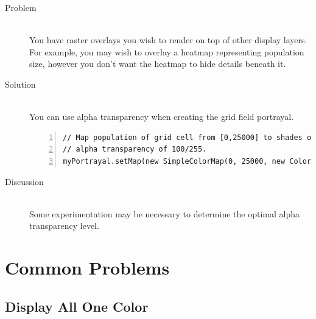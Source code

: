\documentclass[twoside,10pt]{book}
\begin{document}
\begin{description}
\item[Problem]~\\
  You have raster overlays you wish to render on top of other display
  layers.  For example, you may wish to overlay a heatmap representing
  population size, however you don't want the heatmap to hide details
  beneath it.

\item[Solution]~\\
You can use alpha transparency when creating the grid field portrayal.  

\begin{Verbatim}[frame=lines,framesep=5mm,numbers=left]
// Map population of grid cell from [0,25000] to shades of red from [0,255] with 
// alpha transparency of 100/255.
myPortrayal.setMap(new SimpleColorMap(0, 25000, new Color(0,0,0,100), new Color(255,0,0,100)));
\end{Verbatim}

\item[Discussion]~\\
Some experimentation may be necessary to determine the optimal alpha transparency level.
\end{description}







\chapter{Common Problems}
\label{ch:commonprobs}


\section{Display All One Color}
\label{sec:OneColorDisplay}
\end{document}
